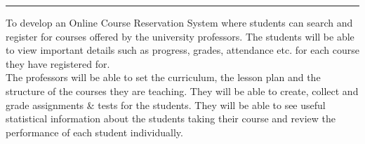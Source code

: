 \documentclass[12pt, a4]{article}
\begin{document}
\maketitle

\hrule
\begin{center}
To develop an Online Course Reservation System where students can search and register for courses offered by the university professors. The students will be able to view important details such as progress, grades, attendance etc. for each course they have registered for.\\
The professors will be able to set the curriculum, the lesson plan and the structure of the courses they are teaching. They will be able to create, collect and grade assignments \& tests for the students. They will be able to see useful statistical information about the students taking their course and review the performance of each student individually.
\end{center}
\end{document}
